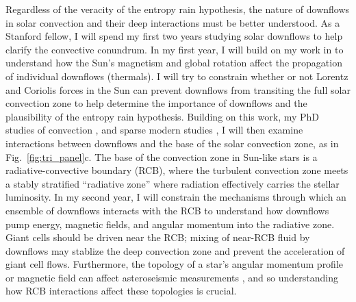 \documentclass[onecolumn, 11pt, hmargin=1in, vmargin=1in]{aastex62}
\begin{document}
Regardless of the veracity of the entropy rain hypothesis, the nature of downflows in solar convection and their deep interactions must be better understood.
As a Stanford fellow, I will spend my first two years studying solar downflows to help clarify the convective conundrum.
In my first year, I will build on my work in \citet{andersLB2019} to understand how the Sun's magnetism and global rotation affect the propagation of individual downflows (thermals).
I will try to constrain whether or not Lorentz and Coriolis forces in the Sun can prevent downflows from transiting the full solar convection zone to help determine the importance of downflows and the plausibility of the entropy rain hypothesis.
Building on this work, my PhD studies of convection \citep{anders&brown2017, anders&all2019}, and sparse modern studies \citep{brummell&all2002, wood&brummell2018}, I will then examine interactions between downflows and the base of the solar convection zone, as in Fig.~\ref{fig:tri_panel}c.
The base of the convection zone in Sun-like stars is a radiative-convective boundary (RCB), where the turbulent convection zone meets a stably stratified ``radiative zone'' where radiation effectively carries the stellar luminosity.
In my second year, I will constrain the mechanisms through which an ensemble of downflows interacts with the RCB to understand how downflows pump energy, magnetic fields, and angular momentum into the radiative zone.
Giant cells should be driven near the RCB; mixing of near-RCB fluid by downflows may stablize the deep convection zone and prevent the acceleration of giant cell flows.
Furthermore, the topology of a star's angular momentum profile or magnetic field can affect asteroseismic measurements \citep{benomar&all2018, santos&all2018}, and so understanding how RCB interactions affect these topologies is crucial.
\end{document}
